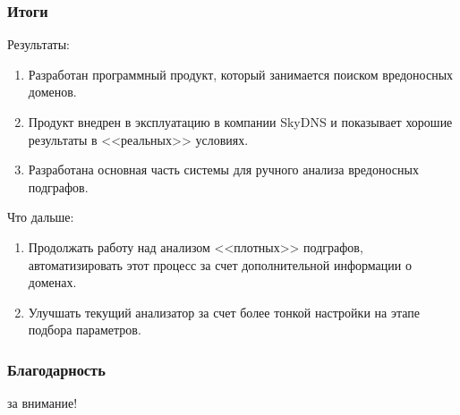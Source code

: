 \documentclass[10pt,pdf,hyperref={unicode}]{beamer}
\begin{document}
\begin{frame}
\frametitle{Итоги}
Результаты:
\begin{enumerate}
	\item Разработан программный продукт, который занимается поиском вредоносных доменов.
	\item Продукт внедрен в эксплуатацию в компании SkyDNS и показывает хорошие результаты в <<реальных>> условиях.
	\item Разработана основная часть системы для ручного анализа вредоносных подграфов.
\end{enumerate}

Что дальше:
\begin{enumerate}
	\item Продолжать работу над анализом <<плотных>> подграфов, автоматизировать этот процесс за счет дополнительной информации о доменах.
	\item Улучшать текущий анализатор за счет более тонкой настройки на этапе подбора параметров.
	
\end{enumerate}
\end{frame}

\begin{frame}
\frametitle{Благодарность}
\Large{} за внимание!
\end{frame}
\end{document}
